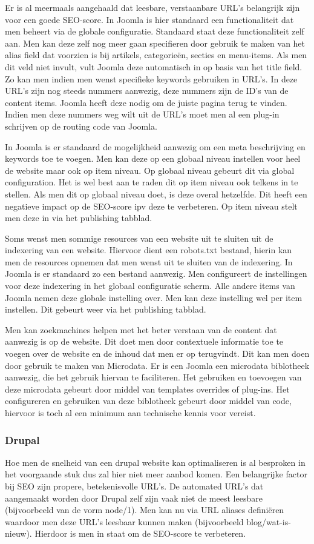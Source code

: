 Er is al meermaals aangehaald dat leesbare, verstaanbare URL's belangrijk zijn voor een goede SEO-score. In Joomla is hier standaard een functionaliteit dat men beheert via de globale configuratie. Standaard staat deze functionaliteit zelf aan. Men kan deze zelf nog meer gaan specifieren door gebruik te maken van het alias field dat voorzien is bij artikels, categorieën, secties en menu-items. Als men dit veld niet invult, vult Joomla deze automatisch in op basis van het title field. Zo kan men indien men wenst specifieke keywords gebruiken in URL's. In deze URL's zijn nog steeds nummers aanwezig, deze nummers zijn de ID's van de content items. Joomla heeft deze nodig om de juiste pagina terug te vinden. Indien men deze nummers weg wilt uit de URL's moet men al een plug-in schrijven op de routing code van Joomla. 

In Joomla is er standaard de mogelijkheid aanwezig om een meta beschrijving en keywords toe te voegen. Men kan deze op een globaal niveau instellen voor heel de website maar ook op item niveau. Op globaal niveau gebeurt dit via global configuration. Het is wel best aan te raden dit op item niveau ook telkens in te stellen. Als men dit op globaal niveau doet, is deze overal hetzelfde. Dit heeft een negatieve impact op de SEO-score ipv deze te verbeteren. Op item niveau stelt men deze in via het publishing tabblad.

Soms wenst men sommige resources van een website uit te sluiten uit de indexering van een website. Hiervoor dient een robots.txt bestand, hierin kan men de resources opnemen dat men wenst uit te sluiten van de indexering. In Joomla is er standaard zo een bestand aanwezig. Men configureert de instellingen voor deze indexering in het globaal configuratie scherm. Alle andere items van Joomla nemen deze globale instelling over. Men kan deze instelling wel per item instellen. Dit gebeurt weer via het publishing tabblad.

Men kan zoekmachines helpen met het beter verstaan van de content dat aanwezig is op de website. Dit doet men door contextuele informatie toe te voegen over de website en de inhoud dat men er op terugvindt. Dit kan men doen door gebruik te maken van Microdata. Er is een Joomla een microdata biblotheek aanwezig, die het gebruik hiervan te faciliteren. Het gebruiken en toevoegen van deze microdata gebeurt door middel van templates overrides of plug-ins. Het configureren en gebruiken van deze biblotheek gebeurt door middel van code, hiervoor is toch al een minimum aan technische kennis voor vereist.
\subsubsection{Drupal}
Hoe men de snelheid van een drupal website kan optimaliseren is al besproken in het voorgaande stuk dus zal hier niet meer aanbod komen. Een belangrijke factor bij SEO zijn propere, betekenisvolle URL's. De automated URL's dat aangemaakt worden door Drupal zelf zijn vaak niet de meest leesbare (bijvoorbeeld van de vorm node/1). Men kan nu via URL aliases definiëren waardoor men deze URL's leesbaar kunnen maken (bijvoorbeeld blog/wat-is-nieuw). Hierdoor is men in staat om de SEO-score te verbeteren.

